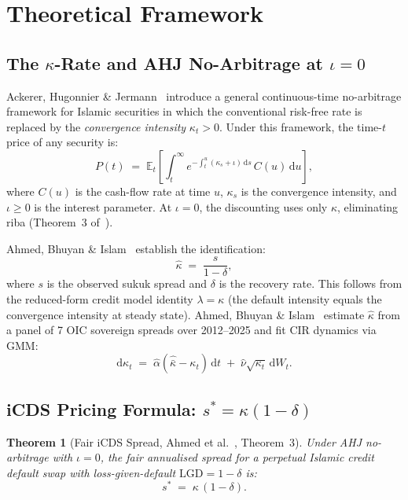 \documentclass[12pt]{article}
\newcommand{\E}{\mathbb{E}}
\newcommand{\dd}{\mathrm{d}}
\theoremstyle{plain}
\newtheorem{theorem}{Theorem}[section]
\theoremstyle{definition}
\theoremstyle{remark}
\begin{document}
\section{Theoretical Framework}
\label{sec:theory}

\subsection{The $\kappa$-Rate and AHJ No-Arbitrage at $\iota = 0$}

Ackerer, Hugonnier \& Jermann~\cite{AHJ2024} introduce a general
continuous-time no-arbitrage framework for Islamic securities in which the
conventional risk-free rate is replaced by the \emph{convergence intensity}
$\kappa_t > 0$.
Under this framework, the time-$t$ price of any security is:
\begin{equation}
  P(t) \;=\; \E_t\!\left[\int_t^\infty
    e^{-\int_t^u (\kappa_s + \iota)\,\dd s}\, C(u)\,\dd u\right],
\end{equation}
where $C(u)$ is the cash-flow rate at time $u$, $\kappa_s$ is the
convergence intensity, and $\iota \geq 0$ is the interest parameter.
At $\iota = 0$, the discounting uses only $\kappa$, eliminating riba
(Theorem~3 of~\cite{AHJ2024}).

Ahmed, Bhuyan \& Islam~\cite{ABIb2026} establish the identification:
\begin{equation}
  \hat{\kappa} \;=\; \frac{s}{1 - \delta},
  \label{eq:identification}
\end{equation}
where $s$ is the observed sukuk spread and $\delta$ is the recovery rate.
This follows from the reduced-form credit model identity $\lambda = \kappa$
(the default intensity equals the convergence intensity at steady state).
Ahmed, Bhuyan \& Islam~\cite{ABIa2026} estimate $\hat{\kappa}$ from a
panel of 7 OIC sovereign spreads over 2012--2025 and fit CIR dynamics via GMM:
\begin{equation}
  \dd\kappa_t \;=\; \hat{\alpha}(\hat{\bar{\kappa}} - \kappa_t)\,\dd t
    \;+\; \hat{\nu}\sqrt{\kappa_t}\,\dd W_t.
  \label{eq:cir}
\end{equation}

\subsection{iCDS Pricing Formula: $s^* = \kappa(1-\delta)$}

\begin{theorem}[Fair iCDS Spread, Ahmed et al.~\cite{ABIb2026}, Theorem~3]
  Under AHJ no-arbitrage with $\iota = 0$, the fair annualised spread for
  a perpetual Islamic credit default swap with loss-given-default
  $\text{LGD} = 1 - \delta$ is:
  \begin{equation}
    s^* \;=\; \kappa\,(1-\delta).
    \label{eq:star}
  \end{equation}
\end{theorem}
\end{document}
